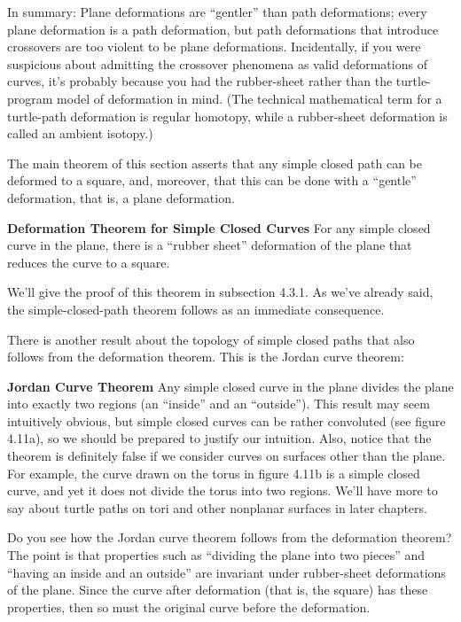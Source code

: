 \documentclass{book}
\begin{document}
In summary: Plane deformations are ``gentler'' than path deformations; 
every plane deformation is a path deformation, but path deformations 
that introduce crossovers are too violent to be plane deformations. 
Incidentally, if you were suspicious about admitting the crossover
phenomena as valid deformations of curves, it's probably because you
had the rubber-sheet rather than the turtle-program model of deformation in 
mind. (The technical mathematical term for a turtle-path deformation is 
regular homotopy, while a rubber-sheet deformation is called
an ambient isotopy.)

The main theorem of this section asserts that any simple closed path
can be deformed to a square, and, moreover, that this can be done with
a ``gentle'' deformation, that is, a plane deformation.

\noindent \textbf{Deformation Theorem for Simple Closed Curves} For any simple closed
curve in the plane, there is a ``rubber sheet'' deformation of the plane
that reduces the curve to a square.

We'll give the proof of this theorem in subsection 4.3.1. As we've
already said, the simple-closed-path theorem follows as an immediate
consequence.

There is another result about the topology of simple closed paths that
also follows from the deformation theorem. This is the Jordan curve
theorem:

\noindent \textbf{Jordan Curve Theorem} Any simple closed curve in the plane divides the
plane into exactly two regions (an ``inside'' and an ``outside'').
This result may seem intuitively obvious, but simple closed curves can
be rather convoluted (see figure 4.11a), so we should be prepared to
justify our intuition. Also, notice that the theorem is definitely false
if we consider curves on surfaces other than the plane. For example,
the curve drawn on the torus in figure 4.11b is a simple closed curve,
and yet it does not divide the torus into two regions. We'll have more
to say about turtle paths on tori and other nonplanar surfaces in later
chapters.

Do you see how the Jordan curve theorem follows from the deformation theorem? The point is that properties such as ``dividing the plane
into two pieces'' and ``having an inside and an outside'' are invariant
under rubber-sheet deformations of the plane. Since the curve after
deformation (that is, the square) has these properties, then so must the
original curve before the deformation.
\end{document}
